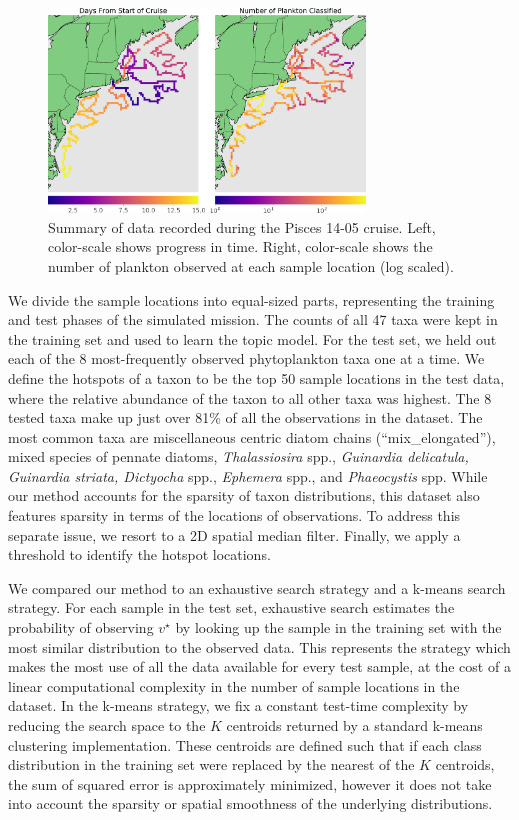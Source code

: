 \begin{figure}
	\centering
	\includegraphics[width=0.75\textwidth]{figures/icra_plankton/n_plankton.png}
	\caption{Summary of data recorded during the Pisces 14-05 cruise. Left, color-scale shows progress in time. Right, color-scale shows the number of plankton observed at each sample location (log scaled).}
	\label{fig:plankton-pisces-summary-in}
\end{figure}

We divide the sample locations into equal-sized parts, representing the training and test phases of the simulated mission. The counts of all 47 taxa were kept in the training set and used to learn the topic model. For the test set, we held out each of the 8 most-frequently observed phytoplankton taxa one at a time. We define the hotspots of
a taxon to be the top 50 sample locations in the test data, where the relative abundance of the taxon to all other taxa was highest. The 8 tested taxa make up just over 81\% of all the observations in the dataset. The most common taxa are miscellaneous centric diatom chains (``mix\_elongated''), mixed species of pennate diatoms, \emph{Thalassiosira} spp., \emph{Guinardia delicatula, Guinardia striata, Dictyocha} spp., \emph{Ephemera} spp., and \emph{Phaeocystis} spp. While our method accounts for the sparsity of taxon distributions, this dataset also features sparsity in terms of the locations of observations. To address this separate issue, we resort to a 2D spatial median filter. Finally, we apply a threshold to identify the hotspot locations.

We compared our method to an exhaustive search strategy and a k-means search strategy. For each sample in the test set, exhaustive search estimates the probability of observing $v^\star$ by looking up the sample in the training set with the most similar distribution to the observed data. This represents the strategy which makes the most use of all the data available for every test sample, at the cost of a linear computational complexity in the number of sample locations in the dataset. In the k-means strategy, we fix a constant test-time complexity by reducing the search space to the $K$ centroids returned by a standard k-means clustering implementation. These centroids are defined such that if each class distribution in the training set were replaced by the nearest of the $K$ centroids, the sum of squared error is approximately minimized, however it does not take into account the sparsity or spatial smoothness of the underlying distributions.

